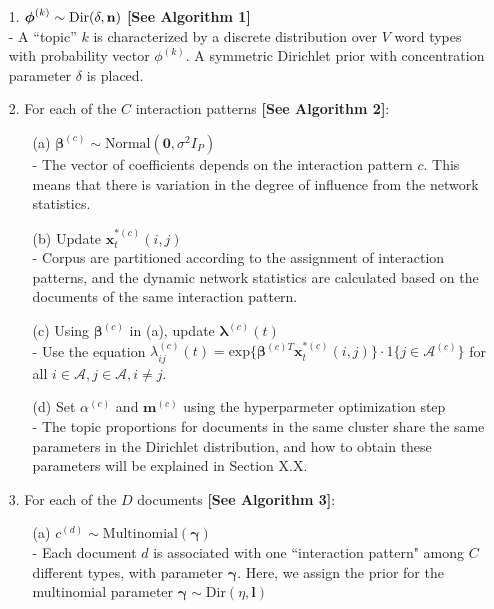 \documentclass[a4paper]{article}
\begin{document}
\begin{itemize}
	\item[1.] {$\boldsymbol{\phi}^{(k)} \sim \mbox{Dir}(\delta, \bf n)$} \textbf{[See Algorithm 1]}\\
	- A “topic” $k$ is characterized by a discrete distribution over $V$ word types with probability vector $\phi^{(k)}$. A symmetric Dirichlet prior with concentration parameter $\delta$ is placed.
\item[2.] For each of the $C$ interaction patterns \textbf{[See Algorithm 2]}:
\begin{itemize}
	\item[(a)] $\boldsymbol{\beta}^{(c)}\sim \mbox{Normal}(\textbf{0}, \sigma^2I_P)$\\ 
	- The vector of coefficients depends on the interaction pattern $c$. This means that there is variation in the degree of influence from the network statistics.
	\item[(b)] Update $\boldsymbol{x}^{*(c)}_t(i, j)$\\
	- Corpus are partitioned according to the assignment of interaction patterns, and the dynamic network statistics are calculated based on the documents of the same interaction pattern.
	\item[(c)] Using $\boldsymbol{\beta}^{(c)}$ in (a), update $\boldsymbol{\lambda}^{(c)}(t)$\\
	- Use the equation $\lambda^{(c)}_{ij}(t)= \mbox{exp}\Big\{\boldsymbol{\beta}^{(c)T}\boldsymbol{x}^{*(c)}_t(i, j)\Big\}\cdot 1\{j \in \mathcal{A}^{(c)}\}$ for all $i \in \mathcal{A}, j \in \mathcal{A}, i\neq j$.
	\item[(d)] Set $\alpha^{(c)}$ and $\boldsymbol{m}^{(c)}$ using the hyperparmeter optimization step\\
	- The topic proportions for documents in the same cluster share the same parameters in the Dirichlet distribution, and how to obtain these parameters will be explained in Section X.X.
\end{itemize}
\item[3.] For each of the $D$ documents \textbf{[See Algorithm 3]}:
\begin{itemize}
	\item[(a)] $c^{(d)}\sim \mbox{Multinomial}(\boldsymbol{\gamma})$\\
	- Each document $d$ is associated with one ``interaction pattern" among $C$ different types, with parameter $\boldsymbol{\gamma}$. Here, we assign the prior for the multinomial parameter $\boldsymbol{\gamma} \sim \mbox{Dir}({\eta}, \boldsymbol{l})$

\end{itemize}
\end{itemize}
\end{document}
